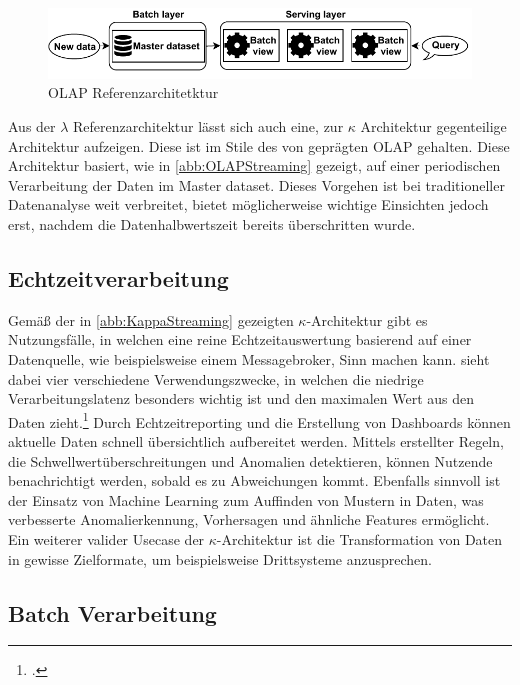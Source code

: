 \begin{figure}[H]
\centering
\includegraphics[width=\textwidth]{graphics/OLAP-Reference-Architecture.pdf}
\caption[OLAP Referenzarchitetktur]{OLAP Referenzarchitetktur\footnotemark}
\label{abb:OLAPStreaming}
\end{figure}

Aus der $\lambda$ Referenzarchitektur lässt sich auch eine, zur $\kappa$ Architektur gegenteilige Architektur aufzeigen. Diese ist im Stile des von \citeauthor{Codd.1993} geprägten \ac{OLAP} gehalten. Diese Architektur basiert, wie in \autoref{abb:OLAPStreaming} gezeigt, auf einer periodischen Verarbeitung der Daten im Master dataset. Dieses Vorgehen ist bei traditioneller Datenanalyse weit verbreitet, bietet möglicherweise wichtige Einsichten jedoch erst, nachdem die Datenhalbwertszeit bereits überschritten wurde.


\subsection{Echtzeitverarbeitung}\label{subsection:echtzeitverarbeitung}
Gemäß der in \autoref{abb:KappaStreaming} gezeigten $\kappa$-Architektur gibt es Nutzungsfälle, in welchen eine reine Echtzeitauswertung basierend auf einer Datenquelle, wie beispielsweise einem Messagebroker, Sinn machen kann. \citeauthor{Belur.2020} sieht dabei vier verschiedene Verwendungszwecke, in welchen die niedrige Verarbeitungslatenz besonders wichtig ist und den maximalen Wert aus den Daten zieht.\footcite[Vgl. auch im Folgenden][]{Belur.2020} Durch Echtzeitreporting und die Erstellung von Dashboards können aktuelle Daten schnell übersichtlich aufbereitet werden. Mittels erstellter Regeln, die Schwellwertüberschreitungen und Anomalien detektieren, können Nutzende benachrichtigt werden, sobald es zu Abweichungen kommt. Ebenfalls sinnvoll ist der Einsatz von Machine Learning zum Auffinden von Mustern in Daten, was verbesserte Anomalierkennung, Vorhersagen und ähnliche Features ermöglicht. Ein weiterer valider Usecase der $\kappa$-Architektur ist die Transformation von Daten in gewisse Zielformate, um beispielsweise Drittsysteme anzusprechen.


\subsection{Batch Verarbeitung}\label{subsection:Batch-Verarbeitun}

